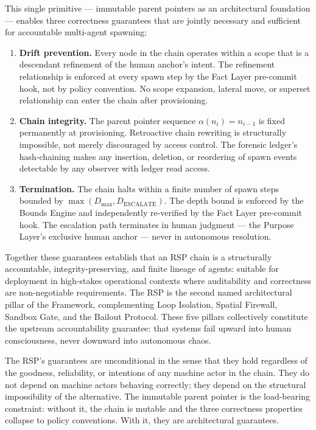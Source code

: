 This single primitive — immutable parent pointers as an architectural foundation — enables three correctness guarantees that are jointly necessary and sufficient for accountable multi-agent spawning:

\begin{enumerate}
    \item[(i)] \textbf{Drift prevention.} Every node in the chain operates within a scope that is a descendant refinement of the human anchor's intent. The refinement relationship is enforced at every spawn step by the Fact Layer pre-commit hook, not by policy convention. No scope expansion, lateral move, or superset relationship can enter the chain after provisioning.

    \item[(ii)] \textbf{Chain integrity.} The parent pointer sequence $\alpha(n_i) = n_{i-1}$ is fixed permanently at provisioning. Retroactive chain rewriting is structurally impossible, not merely discouraged by access control. The forensic ledger's hash-chaining makes any insertion, deletion, or reordering of spawn events detectable by any observer with ledger read access.

    \item[(iii)] \textbf{Termination.} The chain halts within a finite number of spawn steps bounded by $\max(D_{\max}, D_{\mathrm{ESCALATE}})$. The depth bound is enforced by the Bounds Engine and independently re-verified by the Fact Layer pre-commit hook. The escalation path terminates in human judgment — the Purpose Layer's exclusive human anchor — never in autonomous resolution.
\end{enumerate}

Together these guarantees establish that an RSP chain is a structurally accountable, integrity-preserving, and finite lineage of agents: suitable for deployment in high-stakes operational contexts where auditability and correctness are non-negotiable requirements. The RSP is the second named architectural pillar of the \bxthree{} Framework, complementing Loop Isolation, Spatial Firewall, Sandbox Gate, and the Bailout Protocol. These five pillars collectively constitute the upstream \bxthree{} accountability guarantee: that \bxthree{} systems fail upward into human consciousness, never downward into autonomous chaos.

The RSP's guarantees are unconditional in the sense that they hold regardless of the goodness, reliability, or intentions of any machine actor in the chain. They do not depend on machine actors behaving correctly; they depend on the structural impossibility of the alternative. The immutable parent pointer is the load-bearing constraint: without it, the chain is mutable and the three correctness properties collapse to policy conventions. With it, they are architectural guarantees.

